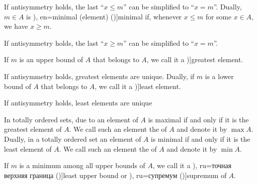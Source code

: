 \begin{definition}
\begin{thmenum}
\begin{TwoColumns*}
      If antisymmetry holds, the last \enquote{\( x \leq m \)} can be simplified to \enquote{\( x = m \)}.
    \BeginSecondColumn
      Dually, \( m \in A \) is \term[ru=минимальный (елемент) (\cite[def. 3.6]{Гуров2013}), en=minimal (element) (\cite[33]{Harzheim2005})]{minimal} if, whenever \( x \leq m \) for some \( x \in A \), we have \( x \geq m \).

      If antisymmetry holds, the last \enquote{\( x \geq m \)} can be simplified to \enquote{\( x = m \)}.
    \end{TwoColumns*}

    \begin{TwoColumns*}
      If \( m \) is an upper bound of \( A \) that belongs to \( A \), we call it a \term[ru=наибольший (елемент) (\cite[def. 3.6]{Гуров2013})]{greatest element}.

      If antisymmetry holds, greatest elements are unique.
    \BeginSecondColumn
      Dually, if \( m \) is a lower bound of \( A \) that belongs to \( A \), we call it a \term[ru=наименьший (елемент) (\cite[def. 3.6]{Гуров2013})]{least element}.

      If antisymmetry holds, least elements are unique
    \end{TwoColumns*}

    \mimprovised
    \begin{TwoColumns*}
      In totally ordered sets, due to  an element of \( A \) is maximal if and only if it is the greatest element of \( A \). We call such an element the  of \( A \) and denote it by \( \max A \).
    \BeginSecondColumn
      Dually, in a totally ordered set an element of \( A \) is minimal if and only if it is the least element of \( A \). We call such an element the  of \( A \) and denote it by \( \min A \).
    \end{TwoColumns*}

    \begin{TwoColumns*}
      If \( m \) is a minimum among all upper bounds of \( A \), we call it a \term[bg=точна горна граница (\cite[19]{Тагамлицки1971Диф}), ru=точная верхняя граница (\cite[]{Ляпин1960})]{least upper bound} or \term[bg=супремум (\cite[10]{Проданов1982}), ru=супремум (\cite[]{Ляпин1960})]{supremum} of \( A \).


\end{TwoColumns*}
\end{thmenum}
\end{definition}
